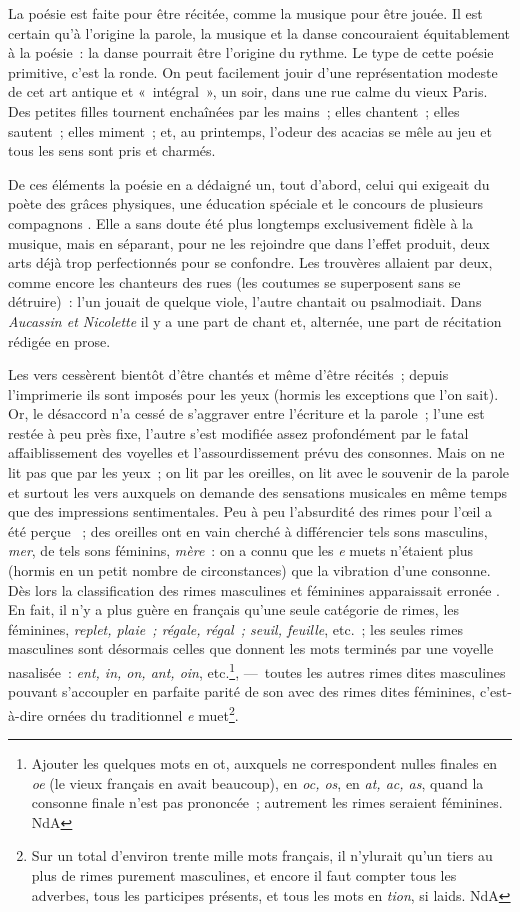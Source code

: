 \documentclass[french,twoside]{book} %
\begin{document}
La poésie est faite pour être récitée, comme la musique pour être jouée. Il est certain qu’à l’origine la parole, la musique et la danse concouraient équitablement à la poésie : la danse pourrait être l’origine du rythme. Le type de cette poésie primitive, c’est la ronde. On peut facilement jouir d’une représentation modeste de cet art antique et « intégral », un soir, dans une rue calme du vieux Paris. Des petites filles tournent enchaînées par les mains ; elles chantent ; elles sautent ; elles miment ; et, au printemps, l’odeur des acacias se mêle au jeu et tous les sens sont pris et charmés.\par
De ces éléments la poésie en a dédaigné un, tout d’abord, celui qui exigeait du poète des grâces physiques, une éducation spéciale et le concours de plusieurs compagnons . Elle a sans doute été plus longtemps exclusivement fidèle à la musique, mais en séparant, pour ne les rejoindre que dans l’effet produit, deux arts déjà trop perfectionnés pour se confondre. Les trouvères allaient par deux, comme encore les chanteurs des rues (les coutumes se superposent sans se détruire) : l’un jouait de quelque viole, l’autre chantait ou psalmodiait. Dans {\itshape Aucassin et Nicolette} il y a une part de chant et, alternée, une part de récitation rédigée en prose.\par
Les vers cessèrent bientôt d’être chantés et même d’être récités ; depuis l’imprimerie ils sont imposés pour les yeux (hormis les exceptions que l’on sait). Or, le désaccord n’a cessé de s’aggraver entre l’écriture et la parole ; l’une est restée à peu près fixe, l’autre s’est modifiée assez profondément par le fatal affaiblissement des voyelles et l’assourdissement prévu des consonnes. Mais on ne lit pas que par les yeux ; on lit par les oreilles, on lit avec le souvenir de la parole et surtout les vers auxquels on demande des sensations musicales en même temps que des impressions sentimentales. Peu à peu l’absurdité des rimes pour l’œil a été perçue  ; des oreilles ont en vain cherché à différencier tels sons masculins, {\itshape mer}, de tels sons féminins, {\itshape mère} : on a connu que les {\itshape e} muets n’étaient plus (hormis en un petit nombre de circonstances) que la vibration d’une consonne. Dès lors la classification des rimes masculines et féminines apparaissait erronée . En fait, il n’y a plus guère en français qu’une seule catégorie de rimes, les féminines, {\itshape replet, plaie ; régale, régal ; seuil, feuille}, etc. ; les seules rimes masculines sont désormais celles que donnent les mots terminés par une voyelle nasalisée : {\itshape ent, in, on, ant, oin}, etc.\footnote{Ajouter les quelques mots en ot, auxquels ne correspondent nulles finales en {\itshape oe} (le vieux français en avait beaucoup), en {\itshape oc, os}, en {\itshape at, ac, as}, quand la consonne finale n’est pas prononcée ; autrement les rimes seraient féminines. NdA}, — toutes les autres rimes dites masculines pouvant s’accoupler en parfaite parité de son avec des rimes dites féminines, c’est-à-dire ornées du traditionnel {\itshape e} muet\footnote{Sur un total d’environ trente mille mots français, il n’ylurait qu’un tiers au plus de rimes purement masculines, et encore il faut compter tous les adverbes, tous les participes présents, et tous les mots en {\itshape tion}, si laids. NdA}.
\end{document}
